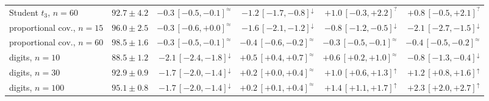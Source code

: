 \documentclass[11pt,a4paper]{article}
\theoremstyle{plain}
\theoremstyle{definition}
\theoremstyle{remark}
\begin{document}
\begin{table}[h]
{\begin{tabular}{@{}lrrrrr@{}}
Student $t_3$, $n{=}60$ & $92.7\pm4.2$ & $-0.3\,[-0.5,-0.1]^{\approx}$ & $-1.2\,[-1.7,-0.8]^{\downarrow}$ & $+1.0\,[-0.3,+2.2]^{?}$ & $+0.8\,[-0.5,+2.1]^{?}$ \\
proportional cov., $n{=}15$ & $96.0\pm2.5$ & $-0.3\,[-0.6,+0.0]^{\approx}$ & $-1.6\,[-2.1,-1.2]^{\downarrow}$ & $-0.8\,[-1.2,-0.5]^{\downarrow}$ & $-2.1\,[-2.7,-1.5]^{\downarrow}$ \\
proportional cov., $n{=}60$ & $98.5\pm1.6$ & $-0.3\,[-0.5,-0.1]^{\approx}$ & $-0.4\,[-0.6,-0.2]^{\approx}$ & $-0.3\,[-0.5,-0.1]^{\approx}$ & $-0.4\,[-0.5,-0.2]^{\approx}$ \\
\midrule
digits, $n{=}10$ & $88.5\pm1.2$ & $-2.1\,[-2.4,-1.8]^{\downarrow}$ & $+0.5\,[+0.4,+0.7]^{\approx}$ & $+0.6\,[+0.2,+1.0]^{\approx}$ & $-0.8\,[-1.3,-0.4]^{\downarrow}$ \\
digits, $n{=}30$ & $92.9\pm0.9$ & $-1.7\,[-2.0,-1.4]^{\downarrow}$ & $+0.2\,[+0.0,+0.4]^{\approx}$ & $+1.0\,[+0.6,+1.3]^{\uparrow}$ & $+1.2\,[+0.8,+1.6]^{\uparrow}$ \\
digits, $n{=}100$ & $95.1\pm0.8$ & $-1.7\,[-2.0,-1.4]^{\downarrow}$ & $+0.2\,[+0.1,+0.4]^{\approx}$ & $+1.4\,[+1.1,+1.7]^{\uparrow}$ & $+2.3\,[+2.0,+2.7]^{\uparrow}$ \\
\bottomrule
\end{tabular}}
\end{table}
\end{document}
